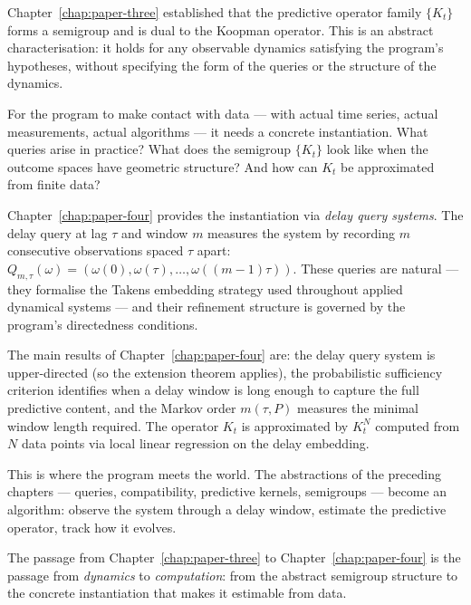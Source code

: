 
Chapter~\ref{chap:paper-three} established that the predictive
operator family $\{K_t\}$ forms a semigroup and is dual to the
Koopman operator.  This is an abstract characterisation: it holds for
any observable dynamics satisfying the program's hypotheses, without
specifying the form of the queries or the structure of the dynamics.

For the program to make contact with data --- with actual time series,
actual measurements, actual algorithms --- it needs a concrete
instantiation.  What queries arise in practice?  What does the
semigroup $\{K_t\}$ look like when the outcome spaces have geometric
structure?  And how can $K_t$ be approximated from finite data?

\medskip

Chapter~\ref{chap:paper-four} provides the instantiation via
\emph{delay query systems}.  The delay query at lag $\tau$ and
window $m$ measures the system by recording $m$ consecutive
observations spaced $\tau$ apart: $Q_{m,\tau}(\omega) =
(\omega(0), \omega(\tau), \ldots, \omega((m-1)\tau))$.  These
queries are natural --- they formalise the Takens embedding strategy
used throughout applied dynamical systems --- and their refinement
structure is governed by the program's directedness conditions.

The main results of Chapter~\ref{chap:paper-four} are:
the delay query system is upper-directed (so the extension theorem
applies), the probabilistic sufficiency criterion identifies when a
delay window is long enough to capture the full predictive content,
and the Markov order $m(\tau, P)$ measures the minimal window length
required.  The operator $K_t$ is approximated by $K_t^N$ computed
from $N$ data points via local linear regression on the delay
embedding.

\medskip

This is where the program meets the world.  The abstractions of the
preceding chapters --- queries, compatibility, predictive kernels,
semigroups --- become an algorithm: observe the system through a delay
window, estimate the predictive operator, track how it evolves.

The passage from Chapter~\ref{chap:paper-three} to
Chapter~\ref{chap:paper-four} is the passage from \emph{dynamics} to
\emph{computation}: from the abstract semigroup structure to the
concrete instantiation that makes it estimable from data.
